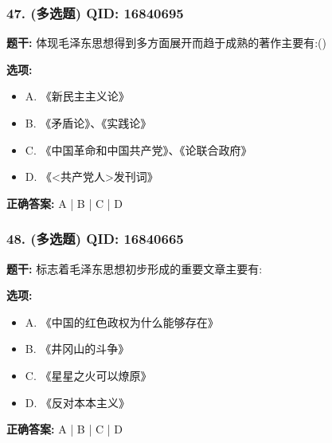 \documentclass[12pt,UTF8]{ctexart}
\begin{document}
\vspace{0.3em}\hrulefill\vspace{0.7em}

\subsubsection*{47. (多选题) \small QID: 16840695}

\textbf{题干:}
体现毛泽东思想得到多方面展开而趋于成熟的著作主要有:()

\textbf{选项:}
\begin{itemize}[leftmargin=*]

  \item A. 《新民主主义论》

  \item B. 《矛盾论》、《实践论》

  \item C. 《中国革命和中国共产党》、《论联合政府》

  \item D. 《<共产党人>发刊词》

\end{itemize}

\textbf{正确答案:}
A | B | C | D

\vspace{0.3em}\hrulefill\vspace{0.7em}

\subsubsection*{48. (多选题) \small QID: 16840665}

\textbf{题干:}
标志着毛泽东思想初步形成的重要文章主要有:

\textbf{选项:}
\begin{itemize}[leftmargin=*]

  \item A. 《中国的红色政权为什么能够存在》

  \item B. 《井冈山的斗争》

  \item C. 《星星之火可以燎原》

  \item D. 《反对本本主义》

\end{itemize}

\textbf{正确答案:}
A | B | C | D

\vspace{0.3em}\hrulefill\vspace{0.7em}
\end{document}
